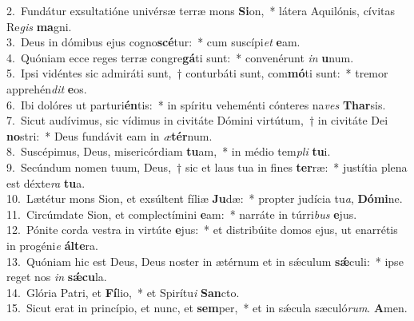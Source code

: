 {2.~}Fundátur exsultatióne univérsæ terræ mons \textbf{Si}on,~* látera Aquilónis, cívitas Re\textit{gis} \textbf{ma}gni.\\
{3.~}Deus in dómibus ejus cogno\textbf{scé}tur:~* cum suscípi\textit{et} \textbf{e}am.\\
{4.~}Quóniam ecce reges terræ congre\textbf{gá}ti sunt:~* convenérunt \textit{in} \textbf{u}num.\\
{5.~}Ipsi vidéntes sic admiráti sunt,~† conturbáti sunt, com\textbf{mó}ti sunt:~* tremor apprehén\textit{dit} \textbf{e}os.\\
{6.~}Ibi dolóres ut parturi\textbf{én}tis:~* in spíritu veheménti cónteres na\textit{ves} \textbf{Thar}sis.\\
{7.~}Sicut audívimus, sic vídimus in civitáte Dómini virtútum,~† in civitáte Dei \textbf{no}stri:~* Deus fundávit eam in \textit{æ}\textbf{tér}num.\\
{8.~}Suscépimus, Deus, misericórdiam \textbf{tu}am,~* in médio tem\textit{pli} \textbf{tu}i.\\
{9.~}Secúndum nomen tuum, Deus,~† sic et laus tua in fines \textbf{ter}ræ:~* justítia plena est déxte\textit{ra} \textbf{tu}a.\\
{10.~}Lætétur mons Sion, et exsúltent fíliæ \textbf{Ju}dæ:~* propter judícia tu\textit{a}, \textbf{Dó}\textbf{mi}ne.\\
{11.~}Circúmdate Sion, et complectímini \textbf{e}am:~* narráte in túrri\textit{bus} \textbf{e}jus.\\
{12.~}Pónite corda vestra in virtúte \textbf{e}jus:~* et distribúite domos ejus, ut enarrétis in progéni\textit{e} \textbf{ál}\textbf{te}ra.\\
{13.~}Quóniam hic est Deus, Deus noster in ætérnum et in sǽculum \textbf{sǽ}culi:~* ipse reget nos \textit{in} \textbf{sǽ}\textbf{cu}la.\\
{14.~}Glória Patri, et \textbf{Fí}lio,~* et Spirítu\textit{i} \textbf{San}cto.\\
{15.~}Sicut erat in princípio, et nunc, et \textbf{sem}per,~* et in sǽcula sæculó\textit{rum}. \textbf{A}men.\\
